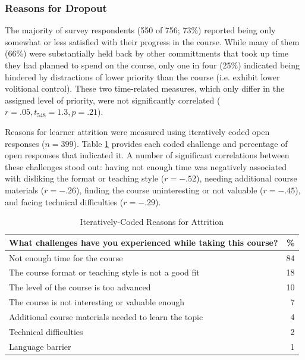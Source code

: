 \documentclass{sigchi}\usepackage[]{graphicx}\usepackage[]{color}
\begin{document}


\subsubsection{Reasons for Dropout}

The majority of survey respondents (550 of 756; 73\%) reported being only somewhat or less satisfied with their progress in the course. While many of them (66\%) were substantially held back by other committments that took up time they had planned to spend on the course, only one in four (25\%) indicated being hindered by distractions of lower priority than the course (i.e. exhibit lower volitional control). These two time-related measures, which only differ in the assigned level of priority, were not significantly correlated ($r=.05, t_{548}=1.3, p=.21$).

Reasons for learner attrition were measured using iteratively coded open responses ($n=399$). Table \ref{tab:s2reas} provides each coded challenge and percentage of open responses that indicated it. A number of significant correlations between these challenges stood out: having not enough time was negatively associated with disliking the format or teaching style ($r=-.52$), needing additional course materials ($r=-.26$), finding the course uninteresting or not valuable ($r=-.45$), and facing technical difficulties ($r=-.29$). 

\begin{table}[h!]
\caption{Iteratively-Coded Reasons for Attrition}
\label{tab:s2reas}
\small
\center
\begin{tabular}{lr}
\toprule
What challenges have you experienced while taking this course?  & \% \\
\midrule
Not enough time for the course & 84 \\
The course format or teaching style is not a good fit & 18 \\
The level of the course is too advanced & 10 \\
The course is not interesting or valuable enough & 7 \\
Additional course materials needed to learn the topic & 4 \\
Technical difficulties & 2 \\
Language barrier & 1 \\
\bottomrule
\end{tabular}
\end{table}
\end{document}
